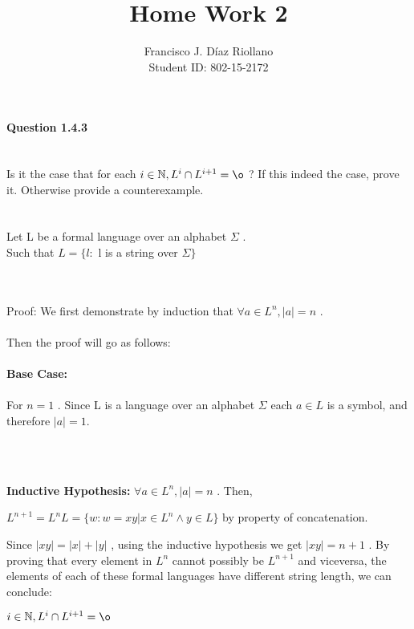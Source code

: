 \documentclass{report}
\title{Home Work 2}
\author{Francisco J. Díaz Riollano \\ Student ID: 802-15-2172 }
\newcommand{\me}[1]{
\begin{math}
#1
\end{math}
}
\begin{document}
\maketitle
\paragraph{\Large{Question 1.4.3\\ \\}}
 Is it the case that for each \me{i \in \mathbb{N},L^i \cap L^{i+1} = \o} ? If this indeed the case, prove it. Otherwise provide a counterexample.\\
 \\ \\
Let L be a formal language over an alphabet \me{\Sigma}.\\  Such that \me{L = \{l:} l is a string over \me{\Sigma \}}
\\ \\
Proof:
We first demonstrate by induction that \me{\forall a \in L^n,|a| = n}. \\ \\
Then the proof will go as follows:
\\ \\
\textbf{Base Case:} \\ \\
For \me{n=1}. Since L is a language over an alphabet \me{\Sigma} each \me{a \in L} is a symbol, and therefore \me{|a|=1.}
\\ \\
\begin{flushleft}
	\textbf{Inductive Hypothesis:} \me{\forall a \in L^n, |a|=n}. Then,
	\me{ L^{n+1} = L^nL= \{w:w =xy| x \in L^n \land y \in L\}} by property of concatenation.
	
	Since \me{|xy|  = |x| + |y|}, using the inductive hypothesis we get \me{|xy| = n +1}.
	\newline \newline
	By proving that every element in \me{L^n} cannot possibly be \me{L^{n+1}} and viceversa, the elements of each of these formal languages have different string length, we can conclude:
\newline \newline
	\me{i \in \mathbb{N},L^i \cap L^{i+1} = \o} 




\end{flushleft}



 
\end{document}
